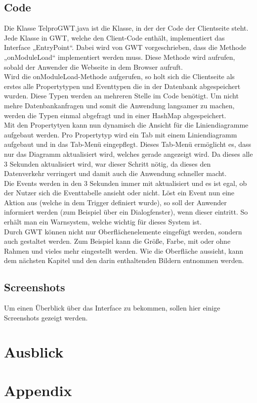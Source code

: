 \documentclass[12pt,a4paper,twoside]{article}
\newcommand{\labelSec}[1]{\label{sec:#1}}
\begin{document}
\subsection{Code}
Die Klasse TelproGWT.java ist die Klasse, in der der Code der Clientseite steht. Jede Klasse in GWT, welche den Client-Code enthält, implementiert das Interface „EntryPoint“. Dabei wird von GWT vorgeschrieben, dass die Methode „onModuleLoad“ implementiert werden muss. Diese Methode wird aufrufen, sobald der Anwender die Webseite in dem Browser aufruft.\\
Wird die onModuleLoad-Methode aufgerufen, so holt sich die Clientseite als erstes alle Propertytypen und Eventtypen die in der Datenbank abgespeichert wurden. Diese Typen werden an mehreren Stelle im Code benötigt. Um nicht mehre Datenbankanfragen und somit die Anwendung langsamer zu machen, werden die Typen einmal abgefragt und in einer HashMap abgespeichert. \\
Mit den Propertytyen kann nun dynamisch die Ansicht für die Liniendiagramme aufgebaut werden. Pro Propertytyp wird ein Tab mit einem Liniendiagramm aufgebaut und in das Tab-Menü eingepflegt. Dieses Tab-Menü ermöglicht es, dass nur das Diagramm aktualisiert wird, welches gerade angezeigt wird. Da dieses alle 3 Sekunden aktualisiert wird, war dieser Schritt nötig, da dieses den Datenverkehr verringert und damit auch die Anwendung schneller macht.\\
Die Events werden in den 3 Sekunden immer mit aktualisiert und es ist egal, ob der Nutzer sich die Eventtabelle ansieht oder nicht. Löst ein Event nun eine Aktion aus (welche in dem Trigger definiert wurde), so soll der Anwender informiert werden (zum Beispiel über ein Dialogfenster), wenn dieser eintritt. So erhält man ein Warnsystem, welche wichtig für dieses System ist.\\
Durch GWT können nicht nur Oberflächenelemente eingefügt werden, sondern auch gestaltet werden. Zum Beispiel kann die Größe, Farbe, mit oder ohne Rahmen und vieles mehr eingestellt werden. Wie die Oberfläche aussieht, kann dem nächsten Kapitel und den darin enthaltenden Bildern entnommen werden.

\subsection{Screenshots}

Um einen Überblick über das Interface zu bekommen, sollen hier einige Screenshots gezeigt  werden.   
  
\section{Ausblick} \labelSec{ausblick}

\clearpage

\section{Appendix}




\end{document}
